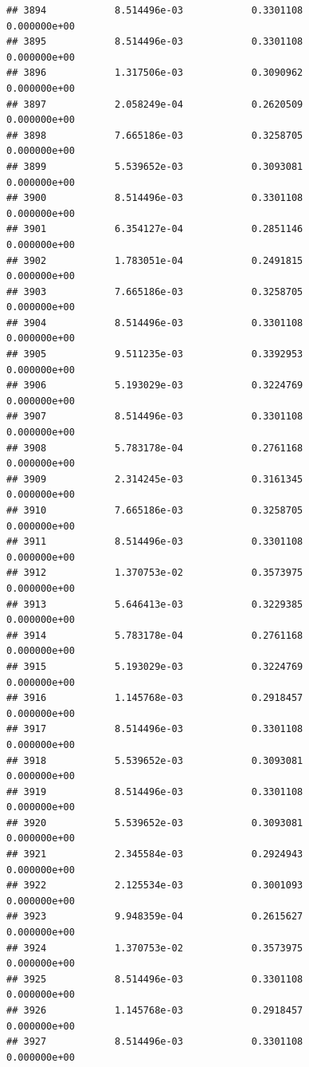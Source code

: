 \documentclass[
]{article}
\begin{document}
\begin{verbatim}
## 3894            8.514496e-03            0.3301108            0.000000e+00
## 3895            8.514496e-03            0.3301108            0.000000e+00
## 3896            1.317506e-03            0.3090962            0.000000e+00
## 3897            2.058249e-04            0.2620509            0.000000e+00
## 3898            7.665186e-03            0.3258705            0.000000e+00
## 3899            5.539652e-03            0.3093081            0.000000e+00
## 3900            8.514496e-03            0.3301108            0.000000e+00
## 3901            6.354127e-04            0.2851146            0.000000e+00
## 3902            1.783051e-04            0.2491815            0.000000e+00
## 3903            7.665186e-03            0.3258705            0.000000e+00
## 3904            8.514496e-03            0.3301108            0.000000e+00
## 3905            9.511235e-03            0.3392953            0.000000e+00
## 3906            5.193029e-03            0.3224769            0.000000e+00
## 3907            8.514496e-03            0.3301108            0.000000e+00
## 3908            5.783178e-04            0.2761168            0.000000e+00
## 3909            2.314245e-03            0.3161345            0.000000e+00
## 3910            7.665186e-03            0.3258705            0.000000e+00
## 3911            8.514496e-03            0.3301108            0.000000e+00
## 3912            1.370753e-02            0.3573975            0.000000e+00
## 3913            5.646413e-03            0.3229385            0.000000e+00
## 3914            5.783178e-04            0.2761168            0.000000e+00
## 3915            5.193029e-03            0.3224769            0.000000e+00
## 3916            1.145768e-03            0.2918457            0.000000e+00
## 3917            8.514496e-03            0.3301108            0.000000e+00
## 3918            5.539652e-03            0.3093081            0.000000e+00
## 3919            8.514496e-03            0.3301108            0.000000e+00
## 3920            5.539652e-03            0.3093081            0.000000e+00
## 3921            2.345584e-03            0.2924943            0.000000e+00
## 3922            2.125534e-03            0.3001093            0.000000e+00
## 3923            9.948359e-04            0.2615627            0.000000e+00
## 3924            1.370753e-02            0.3573975            0.000000e+00
## 3925            8.514496e-03            0.3301108            0.000000e+00
## 3926            1.145768e-03            0.2918457            0.000000e+00
## 3927            8.514496e-03            0.3301108            0.000000e+00

\end{verbatim}
\end{document}
